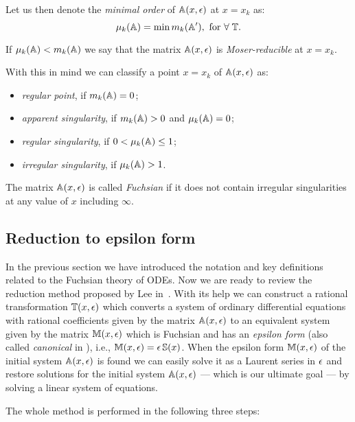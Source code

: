 \documentclass[12pt,a4paper]{article}
\begin{document}
Let us then denote the {\em minimal order} of $\mathbb{A}(x,\epsilon)$ at $x=x_k$ as:
\begin{equation}
\label{eq:muk}
  \mu_k(\mathbb{A}) = \min m_k(\mathbb{A}'), \text{ for } \forall \; \mathbb{T}.
\end{equation}

If $\mu_k(\mathbb{A}) < m_k(\mathbb{A})$ we say that the matrix $\mathbb{A}(x,\epsilon)$ is {\em Moser-reducible} at $x=x_k$.

With this in mind we can classify a point $x=x_k$ of $\mathbb{A}(x,\epsilon)$ as:
\begin{itemize}
  \item {\em regular point}, if $m_k(\mathbb{A}) = 0$;
  \item {\em apparent singularity}, if $m_k(\mathbb{A}) > 0$ and $\mu_k(\mathbb{A}) = 0$;
  \item {\em regular singularity}, if $0 < \mu_k(\mathbb{A}) \le 1$;
  \item {\em irregular singularity}, if $\mu_k(\mathbb{A}) > 1$.
\end{itemize}
The matrix $\mathbb{A}(x,\epsilon)$ is called {\em Fuchsian} if it does not contain irregular singularities at any value of $x$ including $\infty$.


\subsection{Reduction to epsilon form}

In the previous section we have introduced the notation and key definitions related to the Fuchsian theory of ODEs.
Now we are ready to review the reduction method proposed by Lee in~\cite{Lee15}.
With its help we can construct a rational transformation $\mathbb{T}(x,\epsilon)$ which converts a system of ordinary differential equations with rational coefficients given by the matrix $\mathbb{A}(x,\epsilon)$ to an equivalent system given by the matrix $\mathbb{M}(x,\epsilon)$ which is Fuchsian and has an \textit{epsilon form} (also called {\em canonical} in \cite{Henn13}), i.e., $\mathbb{M}(x,\epsilon) = \epsilon\, \mathbb{S}(x)$.
When the epsilon form $\mathbb{M}(x,\epsilon)$ of the initial system $\mathbb{A}(x,\epsilon)$ is found we can easily solve it as a Laurent series in $\epsilon$ and restore solutions for the initial system $\mathbb{A}(x,\epsilon)$ --- which is our ultimate goal --- by solving a linear system of equations.

The whole method is performed in the following three steps:
\end{document}
